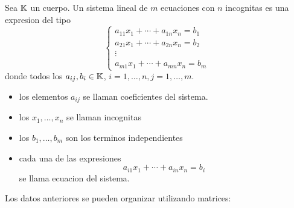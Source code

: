 \begin{definition}
	Sea \(\mathbb{K} \) un cuerpo. Un sistema lineal de \( m \) ecuaciones con \(n \) incognitas es una expresion del tipo
	\[
		\begin{cases}
			a_{11}x_1 + \cdots + a_{1n}x_n = b_1 \\
			a_{21}x_1 + \cdots + a_{2n}x_n = b_2 \\
			\vdots                               \\
			a_{m1}x_1 + \cdots + a_{mn}x_n = b_m
		\end{cases}
	\]
	donde todos los \(a_{ij}, b_i \in  \mathbb{K} \), \(i = 1, \ldots, n, j = 1, \ldots, m \).
	\begin{itemize}
		\item los elementos \(a_{ij }\) se llaman coeficientes del sistema.
		\item los \(x_1, \ldots, x_n \) se llaman incognitas
		\item los \(b_1, \ldots, b_m \) son los terminos independientes
		\item cada una de las expresiones
		      \[
			      a_{i1}x_1 + \cdots + a_{in} x_n = b_i
		      \]
		      se llama ecuacion del sistema.
	\end{itemize}
\end{definition}
Los datos anteriores se pueden organizar utilizando matrices:
